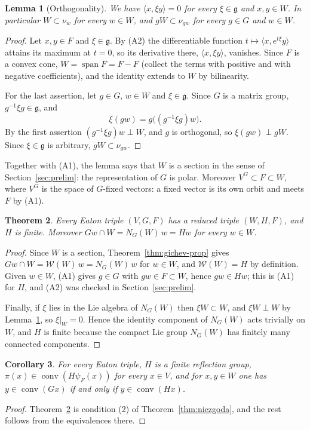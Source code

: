 \documentclass[11pt]{amsart}
\theoremstyle{plain}
\newtheorem{theorem}{Theorem}[section]
\newtheorem{lemma}[theorem]{Lemma}
\newtheorem{corollary}[theorem]{Corollary}
\theoremstyle{definition}
\theoremstyle{remark}
\newcommand{\fg}{\mathfrak g}
\newcommand{\ip}[2]{\langle #1,#2\rangle}
\newcommand{\conv}{\operatorname{conv}}
\newcommand{\spn}{\operatorname{span}}
\begin{document}
\begin{lemma}[Orthogonality]\label{lem:orth}
We have $\ip{x}{\xi y}=0$ for every $\xi\in\fg$ and $x,y\in W$. In particular $W\subset\nu_w$ for every $w\in W$, and $gW\subset\nu_{gw}$ for every $g\in G$ and $w\in W$.
\end{lemma}
\begin{proof}
Let $x,y\in F$ and $\xi\in\fg$. By (A2) the differentiable function $t\mapsto\ip{x}{e^{t\xi}y}$ attains its maximum at $t=0$, so its derivative there, $\ip{x}{\xi y}$, vanishes. Since $F$ is a convex cone, $W=\spn F=F-F$ (collect the terms with positive and with negative coefficients), and the identity extends to $W$ by bilinearity.

For the last assertion, let $g\in G$, $w\in W$ and $\xi\in\fg$. Since $G$ is a matrix group, $g^{-1}\xi g\in\fg$, and
\[
\xi(gw)=g\bigl((g^{-1}\xi g)w\bigr).
\]
By the first assertion $(g^{-1}\xi g)w\perp W$, and $g$ is orthogonal, so $\xi(gw)\perp gW$. Since $\xi\in\fg$ is arbitrary, $gW\subset\nu_{gw}$.
\end{proof}

Together with (A1), the lemma says that $W$ is a section in the sense of Section~\ref{sec:prelim}: the representation of $G$ is polar. Moreover $V^G\subset F\subset W$, where $V^G$ is the space of $G$-fixed vectors: a fixed vector is its own orbit and meets $F$ by (A1).

\begin{theorem}\label{thm:main}
Every Eaton triple $(V,G,F)$ has a reduced triple $(W,H,F)$, and $H$ is finite. Moreover $Gw\cap W=N_G(W)\,w=Hw$ for every $w\in W$.
\end{theorem}
\begin{proof}
Since $W$ is a section, Theorem~\ref{thm:gichev-prop} gives $Gw\cap W=\mathcal W(W)\,w=N_G(W)\,w$ for $w\in W$, and $\mathcal W(W)=H$ by definition. Given $w\in W$, (A1) gives $g\in G$ with $gw\in F\subset W$, hence $gw\in Hw$; this is (A1) for $H$, and (A2) was checked in Section~\ref{sec:prelim}.

Finally, if $\xi$ lies in the Lie algebra of $N_G(W)$ then $\xi W\subset W$, and $\xi W\perp W$ by Lemma~\ref{lem:orth}, so $\xi|_W=0$. Hence the identity component of $N_G(W)$ acts trivially on $W$, and $H$ is finite because the compact Lie group $N_G(W)$ has finitely many connected components.
\end{proof}

\begin{corollary}\label{cor:niezgoda}
For every Eaton triple, $H$ is a finite reflection group, $\pi(x)\in\conv(H\psi_F(x))$ for every $x\in V$, and for $x,y\in W$ one has $y\in\conv(Gx)$ if and only if $y\in\conv(Hx)$.
\end{corollary}
\begin{proof}
Theorem~\ref{thm:main} is condition (2) of Theorem~\ref{thm:niezgoda}, and the rest follows from the equivalences there.
\end{proof}
\end{document}
